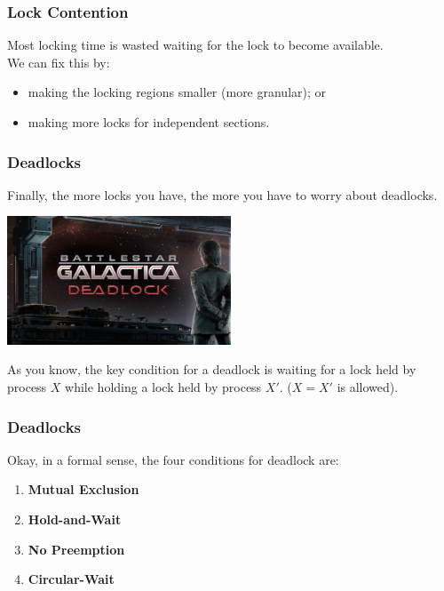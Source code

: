 \begin{frame}
\frametitle{Lock Contention}

\vspace*{-3em}
 Most locking time is wasted waiting for the lock to become available.\\[1em]
We can fix this by:
\vspace*{-3em}
      \begin{itemize}
        \item making the locking regions smaller (more granular); or
        \item making more locks for independent sections.
      \end{itemize}


\end{frame}

\begin{frame}
\frametitle{Deadlocks}

Finally, the more locks you have, the more you have to worry about deadlocks.

\begin{center}
	\includegraphics[width=0.5\textwidth]{images/deadlock.jpg}
\end{center}

As you know, the key condition for a deadlock is waiting for a lock held by process $X$ while holding a lock held by process $X'$. ($X = X'$ is allowed).

\end{frame}


\begin{frame}
\frametitle{Deadlocks}



Okay, in a formal sense, the four conditions for deadlock are:

\begin{enumerate}
	\item \textbf{Mutual Exclusion}
	\item \textbf{Hold-and-Wait}
	\item \textbf{No Preemption}
	\item \textbf{Circular-Wait}
\end{enumerate}

\end{frame}


